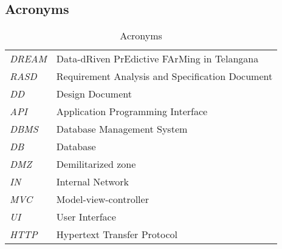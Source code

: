 \subsection{Acronyms}

\begin{center}
\setlength\tabcolsep{7pt}
\renewcommand{\arraystretch}{2}
\begin{longtable}{|m{1.5cm}|m{8.6cm}|}
\caption{Acronyms}\\
\hline
\endfirsthead
\endhead
\hline
\endlastfoot
\textit{DREAM} & Data-dRiven PrEdictive FArMing in Telangana\\
\textit{RASD} & Requirement Analysis and Specification Document\\ \textit{DD} & Design Document\\
\textit{API} & Application Programming Interface\\
\textit{DBMS} & Database Management System\\
\textit{DB} & Database\\
\textit{DMZ} & Demilitarized zone\\
\textit{IN} & Internal Network\\
\textit{MVC} & Model-view-controller\\
\textit{UI} & User Interface\\
\textit{HTTP} & Hypertext Transfer Protocol\\
\end{longtable}
\end{center}